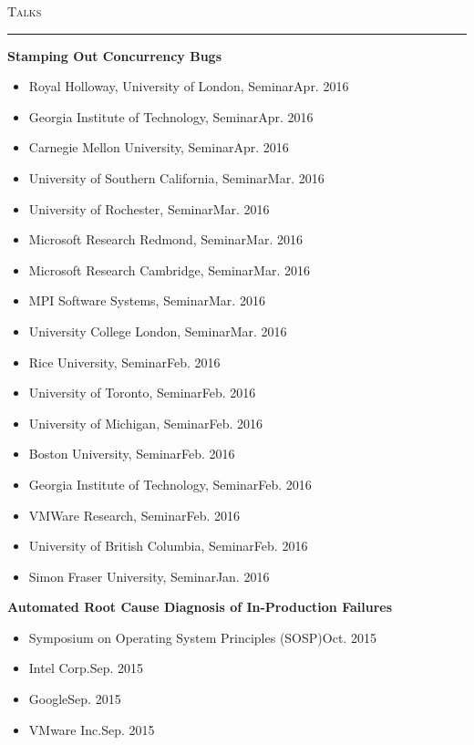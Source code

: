 \documentclass[10pt]{article}
\newcommand{\mysec}[1]{\vspace{2em}\textsc{\large #1}\vspace{1mm}\hrule\vspace{2mm}}
\newcommand{\mysub}[3]{\textbf{#1} {#2} \hfill {\em #3}}
\begin{document}
\mysec{Talks}
\mysub{Stamping Out Concurrency Bugs}{}{} 
\vspace{-2mm}
\begin{itemize}
\setlength\itemsep{0em}
\item{Royal Holloway, University of London, Seminar}\hfill Apr. 2016
\item{Georgia Institute of Technology, Seminar}\hfill Apr. 2016
\item{Carnegie Mellon University, Seminar}\hfill Apr. 2016
\item{University of Southern California, Seminar}\hfill Mar. 2016
\item{University of Rochester, Seminar}\hfill Mar. 2016
\item{Microsoft Research Redmond, Seminar}\hfill Mar. 2016
\item{Microsoft Research Cambridge, Seminar}\hfill Mar. 2016
\item{MPI Software Systems, Seminar}\hfill Mar. 2016
\item{University College London, Seminar}\hfill Mar. 2016
\item{Rice University, Seminar}\hfill Feb. 2016
\item{University of Toronto, Seminar}\hfill Feb. 2016
\item{University of Michigan, Seminar}\hfill Feb. 2016
\item{Boston University, Seminar}\hfill Feb. 2016
\item{Georgia Institute of Technology, Seminar}\hfill Feb. 2016
\item{VMWare Research, Seminar}\hfill Feb. 2016
\item{University of British Columbia, Seminar}\hfill Feb. 2016
\item{Simon Fraser University, Seminar}\hfill Jan. 2016
\end{itemize}
\mysub{Automated Root Cause Diagnosis of In-Production Failures}{}{} 
\vspace{-2mm}
\begin{itemize}
\setlength\itemsep{0em}
\item{Symposium on Operating System Principles (SOSP)}\hfill Oct. 2015
\item{Intel Corp.}\hfill Sep. 2015
\item{Google}\hfill Sep. 2015
\item{VMware Inc.}\hfill Sep. 2015
\end{itemize}
\end{document}
